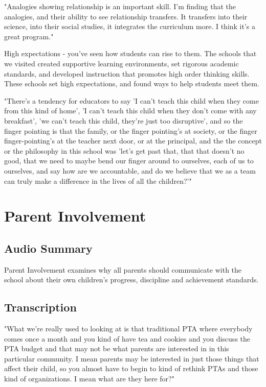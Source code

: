 "Analogies showing relationship is an important skill. I'm finding that the analogies, and their ability to see relationship transfers. It transfers into their science, into their social studies, it integrates the curriculum more. I think it's a great program."

High expectations - you've seen how students can rise to them. The schools that we visited created supportive learning environments, set rigorous academic standards, and developed instruction that promotes high order thinking skills. These schools set high expectations, and found ways to help students meet them.

"There's a tendency for educators to say 'I can't teach this child when they come from this kind of home', 'I can't teach this child when they don't come with any breakfast', 'we can't teach this child, they're just too disruptive', and so the finger pointing is that the family, or the finger pointing's at society, or the finger finger-pointing's at the teacher next door, or at the principal, and the the concept or the philosophy in this school was 'let's get past that, that that doesn't no good, that we need to maybe bend our finger around to ourselves, each of us to ourselves, and say how are we accountable, and do we believe that we as a team can truly make a difference in the lives of all the children?'"

\section{Parent Involvement}

\subsection{Audio Summary}

Parent Involvement examines why all parents should communicate with the school about their own children's progress, discipline and achievement standards.

\subsection{Transcription}

"What we're really used to looking at is that traditional PTA where everybody comes once a month and you kind of have tea and cookies and you discuss the PTA budget and that may not be what parents are interested in in this particular community. I mean parents may be interested in just those things that affect their child, so you almost have to begin to kind of rethink PTAs and those kind of organizations. I mean what are they here for?"

